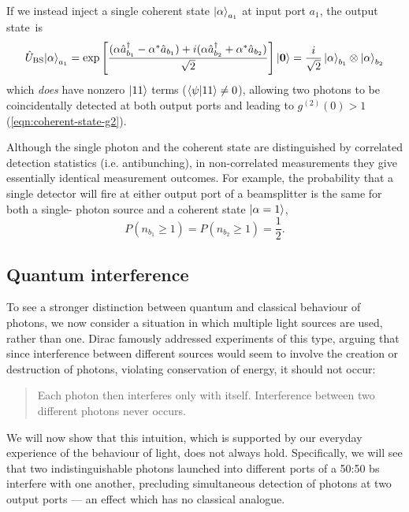 If we instead inject a single coherent state $\mbox{$ | \alpha \rangle $}_{a_1}$ at input port $a_1$, the output state~is
\begin{equation}
    \hat{U}_\mathrm{BS} \mbox{$ | \alpha \rangle $}_{a_1} = 
    \exp\left[
        \frac{
            ( \alpha \hat{a}^{\dagger}_{b_1} - \alpha^* \hat{a}_{b_1} ) +
        i ( \alpha \hat{a}^{\dagger}_{b_2} + \alpha^* \hat{a}_{b_2} )}
{\sqrt{2}}
    \right] \mbox{$ | \mathbf{0} \rangle $}
    =
    \frac{i}{\sqrt{2}}  \, \mbox{$ | \alpha \rangle $}_{b_1}  \otimes \mbox{$ | \alpha \rangle $}_{b_2} 
    \label{eqn:coherent-output}
\end{equation}
which \emph{does} have nonzero $\mbox{$ | 11 \rangle $}$ terms ($\langle \psi | 11 \rangle\ne0$), allowing two photons to be coincidentally detected at both output ports and leading to $g^{(2)}(0)>1$ (\ref{eqn:coherent-state-g2}). 

Although the single photon and the coherent state are distinguished by correlated detection statistics (i.e. antibunching), in non-correlated measurements they give essentially identical measurement outcomes. For example, the probability that a single detector will fire at either output port of a beamsplitter is the same for both a single- photon source and a coherent state $\mbox{$ | \alpha=1 \rangle $}$,
\begin{equation}
    P(n_{b_1}\ge1) = P(n_{b_2}\ge1) = \frac{1}{2}.
\end{equation}

\subsection{Quantum interference}
\label{sec:quantum-interference}
To see a stronger distinction between quantum and classical behaviour of photons, we now consider a situation in which multiple light sources are used, rather than one. 
Dirac famously addressed experiments of this type, arguing that since interference between different sources would seem to involve the creation or destruction of photons, violating conservation of energy, it should not occur:
\begin{quote}
    Each photon then interferes only with itself.  Interference between two different photons never occurs. 
 \end{quote}
We will now show that this intuition, which is supported by our everyday experience of the behaviour of light, does not always hold. Specifically, we will see that two indistinguishable photons launched into different ports of a 50:50 \gls{bs} interfere with one another, precluding simultaneous detection of photons at two output ports --- an effect which has no classical analogue. 

